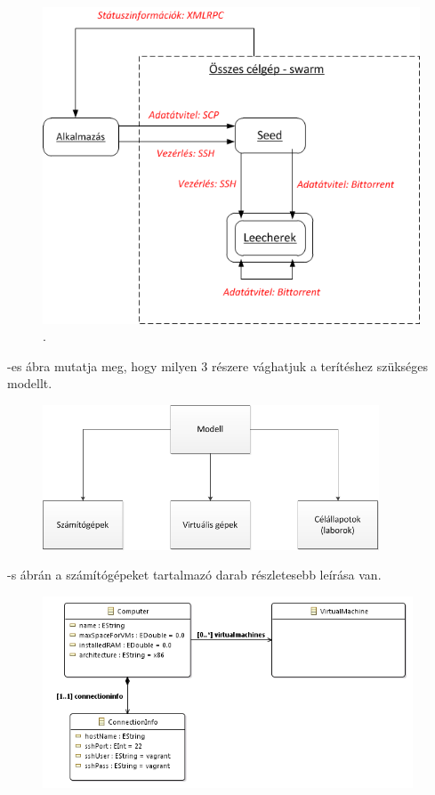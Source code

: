 \begin{figure}[ht]
	\centering
	\includegraphics[width=140mm, keepaspectratio]{figures/design_protocols.png}
	\caption{.}
	\label{fig:designprotocols}
\end{figure}

-es ábra mutatja meg, hogy milyen 3 részere vághatjuk a terítéshez szükséges modellt.

\begin{figure}[ht]
	\centering
	\includegraphics[width=100mm, keepaspectratio]{figures/design_modelparts.png}
	\caption{}
	\label{fig:designmodelparts}
\end{figure}

-s ábrán a számítógépeket tartalmazó darab részletesebb leírása van.

\begin{figure}[ht]
	\centering
	\includegraphics[width=110mm, keepaspectratio]{figures/design_computer.png}
	\caption{}
	\label{fig:designcomputers}
\end{figure}

